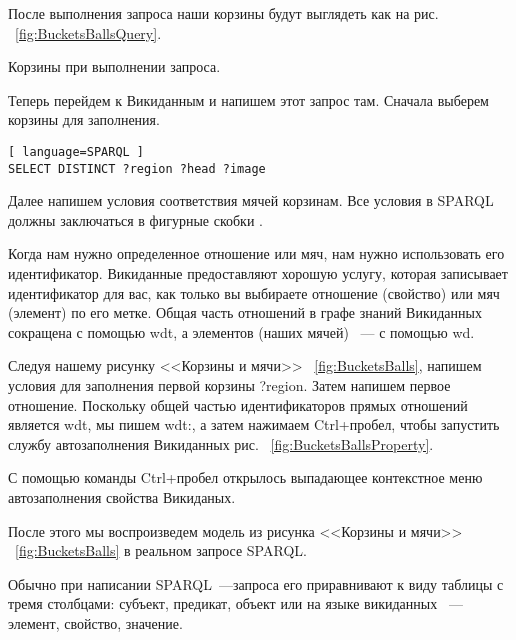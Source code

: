 \newpage
После выполнения запроса наши корзины будут выглядеть как на рис. ~\ref{fig:BucketsBallsQuery}.

\begin{marginfigure}
	{
		\setlength{\fboxsep}{0pt}%
		\setlength{\fboxrule}{1pt}%
	}
    \caption{Корзины при выполнении запроса.}
	\label{fig:BucketsBallsQuery}
\end{marginfigure}

Теперь перейдем к Викиданным и напишем этот запрос там. Сначала выберем корзины для заполнения.

\begin{lstlisting}[ language=SPARQL ]
SELECT DISTINCT ?region ?head ?image
\end{lstlisting}

Далее напишем условия соответствия мячей корзинам. Все условия в SPARQL должны заключаться в фигурные скобки {}.

Когда нам нужно определенное отношение или мяч, нам нужно использовать его идентификатор. Викиданные предоставляют хорошую услугу, которая записывает идентификатор для вас, как только вы выбираете отношение (свойство) или мяч (элемент) по его метке. Общая часть отношений в графе знаний Викиданных сокращена с помощью wdt, а элементов (наших мячей) ~--- с помощью wd.

Следуя нашему рисунку <<Корзины и мячи>> ~\ref{fig:BucketsBalls}, напишем условия для заполнения первой корзины ?region. Затем напишем первое отношение. Поскольку общей частью идентификаторов прямых отношений является wdt, мы пишем wdt:, а затем нажимаем Ctrl+пробел, чтобы запустить службу автозаполнения Викиданных рис. ~\ref{fig:BucketsBallsProperty}.

\begin{marginfigure}[-2.5cm]
	{
		\setlength{\fboxsep}{0pt}%
		\setlength{\fboxrule}{1pt}%
	}
    \caption{С помощью команды Ctrl+пробел открылось выпадающее контекстное меню автозаполнения свойства Викиданых.}
	\label{fig:BucketsBallsProperty}
\end{marginfigure}

После этого мы воспроизведем модель из рисунка <<Корзины и мячи>> ~\ref{fig:BucketsBalls} в реальном запросе SPARQL.

Обычно при написании SPARQL~---запроса его приравнивают к виду таблицы с тремя столбцами: субъект, предикат, объект или на языке викиданных ~--- элемент, свойство, значение.

